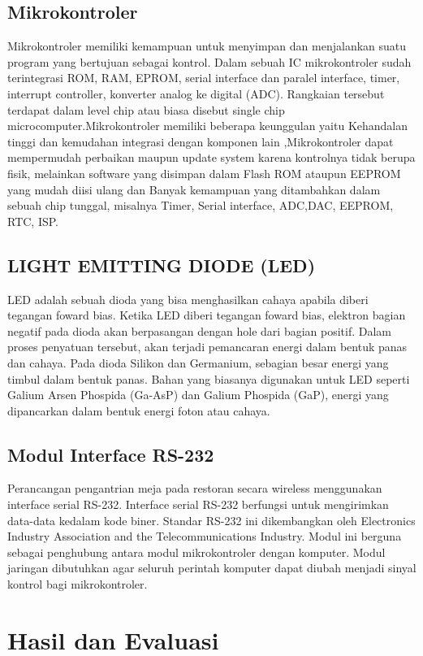 \subsection{Mikrokontroler}
Mikrokontroler memiliki kemampuan untuk menyimpan dan menjalankan suatu program yang bertujuan sebagai kontrol.
Dalam sebuah IC mikrokontroler sudah terintegrasi ROM, RAM, EPROM, serial interface dan paralel
interface, timer, interrupt controller, konverter analog ke digital (ADC). Rangkaian tersebut terdapat dalam level chip atau biasa disebut single chip microcomputer.Mikrokontroler memiliki beberapa keunggulan yaitu Kehandalan tinggi dan kemudahan integrasi dengan komponen lain ,Mikrokontroler dapat mempermudah perbaikan maupun update system karena kontrolnya tidak berupa fisik,
melainkan software yang disimpan dalam Flash ROM ataupun EEPROM yang mudah diisi ulang dan Banyak kemampuan yang ditambahkan dalam sebuah chip tunggal, misalnya Timer, Serial interface, ADC,DAC, EEPROM, RTC, ISP.
\subsection{LIGHT EMITTING DIODE (LED)}
LED adalah sebuah dioda yang bisa menghasilkan cahaya apabila diberi tegangan foward bias. Ketika LED diberi tegangan foward bias, elektron bagian negatif pada dioda akan berpasangan dengan hole dari bagian positif. 
Dalam proses penyatuan tersebut, akan terjadi pemancaran energi dalam bentuk panas dan cahaya. Pada dioda Silikon dan Germanium, sebagian besar energi yang timbul dalam bentuk panas. Bahan yang biasanya digunakan untuk LED seperti Galium Arsen Phospida (Ga-AsP) dan Galium Phospida (GaP), energi yang dipancarkan dalam bentuk energi foton atau cahaya.
\subsection{Modul Interface RS-232}
Perancangan pengantrian meja pada restoran secara wireless  menggunakan  interface serial RS-232. Interface serial RS-232 berfungsi untuk mengirimkan data-data kedalam kode biner. Standar RS-232 ini dikembangkan oleh Electronics Industry Association and the Telecommunications Industry. Modul ini berguna sebagai penghubung antara modul mikrokontroler dengan komputer. Modul jaringan  dibutuhkan agar seluruh perintah komputer dapat diubah menjadi sinyal kontrol bagi mikrokontroler. 


\section{Hasil dan Evaluasi}
